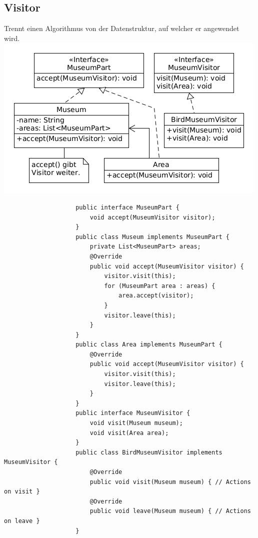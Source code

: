 \documentclass[a4paper, landscape, 8pt]{scrartcl}
\begin{document}
\begin{multicols*}{4}
            \subsection{Visitor}
                Trennt einen Algorithmus von der Datenstruktur, auf welcher er angewendet wird.\\
                \includegraphics[scale=0.275]{graphic/26_visitor_uml.png}
                \begin{lstlisting}
                    public interface MuseumPart {
                        void accept(MuseumVisitor visitor);
                    }
                    public class Museum implements MuseumPart {
                        private List<MuseumPart> areas;
                        @Override
                        public void accept(MuseumVisitor visitor) {
                            visitor.visit(this);
                            for (MuseumPart area : areas) {
                                area.accept(visitor);
                            }
                            visitor.leave(this);
                        }
                    }
                    public class Area implements MuseumPart {
                        @Override
                        public void accept(MuseumVisitor visitor) {
                            visitor.visit(this);
                            visitor.leave(this);
                        }
                    }
                    public interface MuseumVisitor {
                        void visit(Museum museum);
                        void visit(Area area);
                    }
                    public class BirdMuseumVisitor implements MuseumVisitor {
                        @Override
                        public void visit(Museum museum) { // Actions on visit }
                        @Override
                        public void leave(Museum museum) { // Actions on leave }
                    }


\end{lstlisting}
\end{multicols*}
\end{document}
